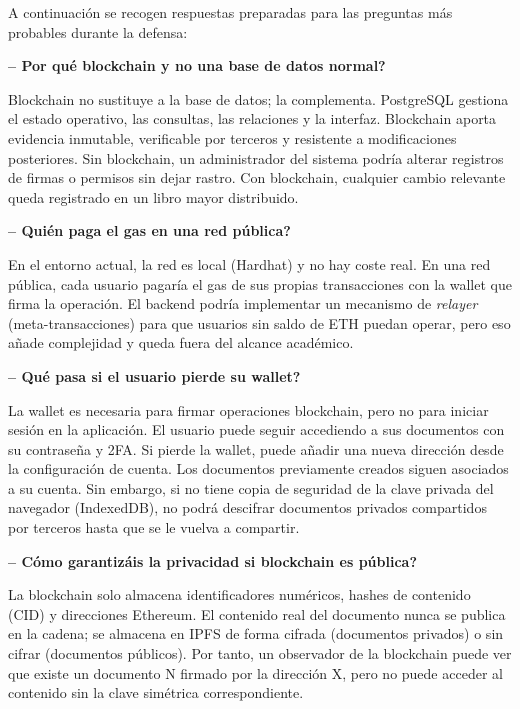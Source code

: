 \documentclass[11pt, a4paper]{article}
\begin{document}
A continuaci\'on se recogen respuestas preparadas para las preguntas m\'as probables durante la defensa:

\textbf{-- \textquestiondown Por qu\'e blockchain y no una base de datos normal?}

Blockchain no sustituye a la base de datos; la complementa. PostgreSQL gestiona el estado operativo, las consultas, las relaciones y la interfaz. Blockchain aporta evidencia inmutable, verificable por terceros y resistente a modificaciones posteriores. Sin blockchain, un administrador del sistema podr\'ia alterar registros de firmas o permisos sin dejar rastro. Con blockchain, cualquier cambio relevante queda registrado en un libro mayor distribuido.

\textbf{-- \textquestiondown Qui\'en paga el gas en una red p\'ublica?}

En el entorno actual, la red es local (Hardhat) y no hay coste real. En una red p\'ublica, cada usuario pagar\'ia el gas de sus propias transacciones con la wallet que firma la operaci\'on. El backend podr\'ia implementar un mecanismo de \textit{relayer} (meta-transacciones) para que usuarios sin saldo de ETH puedan operar, pero eso a\~nade complejidad y queda fuera del alcance acad\'emico.

\textbf{-- \textquestiondown Qu\'e pasa si el usuario pierde su wallet?}

La wallet es necesaria para firmar operaciones blockchain, pero no para iniciar sesi\'on en la aplicaci\'on. El usuario puede seguir accediendo a sus documentos con su contrase\~na y 2FA. Si pierde la wallet, puede a\~nadir una nueva direcci\'on desde la configuraci\'on de cuenta. Los documentos previamente creados siguen asociados a su cuenta. Sin embargo, si no tiene copia de seguridad de la clave privada del navegador (IndexedDB), no podr\'a descifrar documentos privados compartidos por terceros hasta que se le vuelva a compartir.

\textbf{-- \textquestiondown C\'omo garantiz\'ais la privacidad si blockchain es p\'ublica?}

La blockchain solo almacena identificadores num\'ericos, hashes de contenido (CID) y direcciones Ethereum. El contenido real del documento nunca se publica en la cadena; se almacena en IPFS de forma cifrada (documentos privados) o sin cifrar (documentos p\'ublicos). Por tanto, un observador de la blockchain puede ver que existe un documento N firmado por la direcci\'on X, pero no puede acceder al contenido sin la clave sim\'etrica correspondiente.
\end{document}
